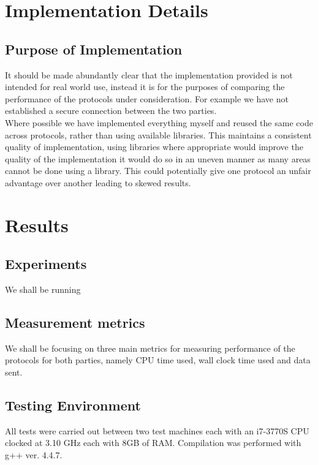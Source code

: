 \documentclass[a4paper,11pt]{article}
\begin{document}
	\section{Implementation Details} \label{sec:ImplementationDetails}
		\subsection{Purpose of Implementation}
			It should be made abundantly clear that the implementation provided is not intended for real world use, instead it is for the purposes of comparing the performance of the protocols under consideration. For example we have not established a secure connection between the two parties.\\

			Where possible we have implemented everything myself and reused the same code across protocols, rather than using available libraries. This maintains a consistent quality of implementation, using libraries where appropriate would improve the quality of the implementation it would do so in an uneven manner as many areas cannot be done using a library. This could potentially give one protocol an unfair advantage over another leading to skewed results.\\

		\subsection{}


	\section{Results} \label{sec:Results}
		\subsection{Experiments}
			We shall be running 
		\subsection{Measurement metrics}
			We shall be focusing on three main metrics for measuring performance of the protocols for both parties, namely CPU time used, wall clock time used and data sent.\\

			

		\subsection{Testing Environment}
			All tests were carried out between two test machines each with an i7-3770S CPU clocked at 3.10 GHz each with 8GB of RAM. Compilation was performed with g++ ver. 4.4.7. 
\end{document}
